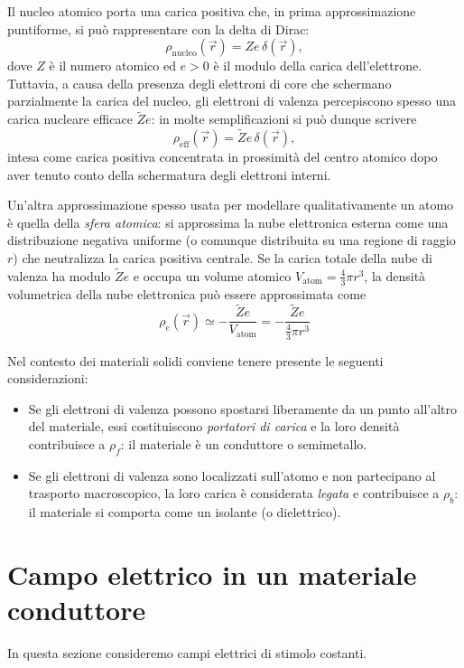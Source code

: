 \documentclass{book}
\begin{document}
Il nucleo atomico porta una carica positiva che, in prima approssimazione puntiforme, si può rappresentare con la delta di Dirac:
\[
\rho_{\mathrm{nucleo}}(\vec{r}) = Z e\,\delta(\vec{r}),
\]
dove $Z$ è il numero atomico ed $e>0$ è il modulo della carica dell'elettrone. Tuttavia, a causa della presenza degli elettroni di core che schermano parzialmente la carica del nucleo, gli elettroni di valenza percepiscono spesso una carica nucleare efficace $\tilde{Z}e$: in molte semplificazioni si può dunque scrivere
\[
\rho_{\mathrm{eff}}(\vec{r}) = \tilde{Z}e\,\delta(\vec{r}),
\]
intesa come carica positiva concentrata in prossimità del centro atomico dopo aver tenuto conto della schermatura degli elettroni interni.

Un'altra approssimazione spesso usata per modellare qualitativamente un atomo è quella della \emph{sfera atomica}: si approssima la nube elettronica esterna come una distribuzione negativa uniforme (o comunque distribuita su una regione di raggio $r$) che neutralizza la carica positiva centrale. Se la carica totale della nube di valenza ha modulo $\tilde{Z}e$ e occupa un volume atomico $V_{\mathrm{atom}}=\tfrac{4}{3}\pi r^3$, la densità volumetrica della nube elettronica può essere approssimata come
\[
\rho_{e}(\vec{r}) \simeq -\frac{\tilde{Z}e}{V_{\mathrm{atom}}} = -\frac{\tilde{Z}e}{\tfrac{4}{3}\pi r^3}
\]

Nel contesto dei materiali solidi conviene tenere presente le seguenti considerazioni:

\begin{itemize}
  \item Se gli elettroni di valenza possono spostarsi liberamente da un punto all'altro del materiale, essi costituiscono \emph{portatori di carica} e la loro densità contribuisce a $\rho_f$: il materiale è un conduttore o semimetallo.
  \item Se gli elettroni di valenza sono localizzati sull'atomo e non partecipano al trasporto macroscopico, la loro carica è considerata \emph{legata} e contribuisce a $\rho_b$: il materiale si comporta come un isolante (o dielettrico).
\end{itemize}


\section{Campo elettrico in un materiale conduttore}
In questa sezione consideremo campi elettrici di stimolo costanti.
\end{document}
